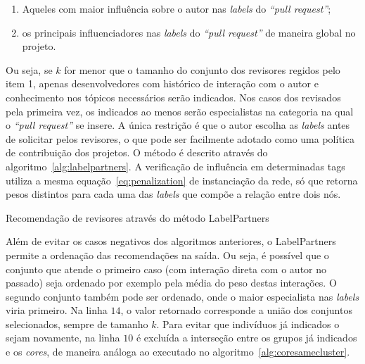 \documentclass[12pt,openany,oneside,a4paper,english,brazil]{abntbibufjf}
\begin{document}
\begin{enumerate}
  \item Aqueles com maior influência sobre o autor nas \textit{labels} do \textit{``pull request''};
  \item os principais influenciadores nas \textit{labels} do \textit{``pull request''} de maneira global no projeto.
\end{enumerate}

  Ou seja, se $k$ for menor que o tamanho do conjunto dos revisores regidos pelo item 1, apenas desenvolvedores com histórico de interação com o autor e conhecimento nos tópicos necessários serão indicados. Nos casos dos revisados pela primeira vez, os indicados ao menos serão especialistas na categoria na qual o \textit{``pull request''} se insere. A única restrição é que o autor escolha as \textit{labels} antes de solicitar pelos revisores, o que pode ser facilmente adotado como uma política de contribuição dos projetos. O método é descrito através do algoritmo~\ref{alg:labelpartners}. A verificação de influência em determinadas tags utiliza a mesma equação~\ref{eq:penalization} de instanciação da rede, só que retorna pesos distintos para cada uma das \textit{labels} que compõe a relação entre dois nós.

  \begin{algorithm}

   \caption{Recomendação de revisores através do método LabelPartners}\label{alg:labelpartners}

  \end{algorithm}

Além de evitar os casos negativos dos algoritmos anteriores, o LabelPartners permite a ordenação das recomendações na saída. Ou seja, é possível que o conjunto que atende o primeiro caso (com interação direta com o autor no passado) seja ordenado por exemplo pela média do peso destas interações. O segundo conjunto também pode ser ordenado, onde o maior especialista nas \textit{labels} viria primeiro. Na linha $14$, o valor retornado corresponde a união dos conjuntos selecionados, sempre de tamanho $k$. Para evitar que indivíduos já indicados o sejam novamente, na linha $10$ é excluída a interseção entre os grupos já indicados e os \textit{cores}, de maneira análoga ao executado no algoritmo~\ref{alg:coresamecluster}.
\end{document}
